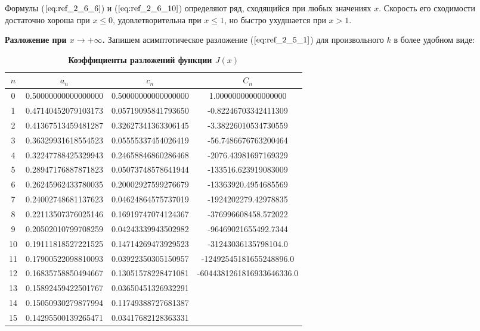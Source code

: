 Формулы ($\ref{eq:ref_2_6_6}$) и ($\ref{eq:ref_2_6_10}$) определяют ряд, сходящийся при любых значениях $x$.
Скорость его сходимости достаточно хороша при $x \leqslant 0$, удовлетворительна при
$x \leqslant 1$, но быстро ухудшается при $x > 1$.

\textbf{Разложение при $x \to +\infty$.} Запишем асимптотическое разложение ($\ref{eq:ref_2_5_1}$) для
произвольного $k$ в более удобном виде:

\begin{table}[]
\caption{\textbf{Коэффициенты разложений функции $J(x)$}}
\begin{center}
\begin{tabular}{|c|c|c|c|}
\hline
$n$ & $a_n$ & $c_n$ & $C_n$ \\
\hline
0  & 0.50000000000000000 & 0.50000000000000000 & 1.00000000000000000 \\
1  & 0.47140452079103173 & 0.05719095841793650 & -0.82246703342411309 \\
2  & 0.41367513459481287 & 0.32627341363306145 & -3.38226010534730559 \\
3  & 0.36329931618554523 & 0.05555337454026419 & -56.7486676763200464 \\
4  & 0.32247788425329943 & 0.24658846860286468 & -2076.43981697169329 \\
5  & 0.28947176887871823 & 0.05073748578641944 & -133516.623919083009 \\
6  & 0.26245962433780035 & 0.20002927599276679 & -13363920.4954685569 \\
7  & 0.24002748681137623 & 0.04624864575737019 & -1924202279.42978835 \\
8  & 0.22113507376025146 & 0.16919747074124367 & -376996608458.572022 \\
9  & 0.20502010799708259 & 0.04243339943502982 & -96469021655492.7344 \\
10 & 0.19111818527221525 & 0.14714269473929523 & -31243036135798104.0  \\
11 & 0.17900522098810093 & 0.03922350305150957 & -12492545181655248896.0 \\
12 & 0.16835758850494667 & 0.13051578228471081 & -6044381261816933646336.0 \\
13 & 0.15892459422501767 & 0.03650451326932291 &                      \\
14 & 0.15050930279877994 & 0.11749388727681387 &                      \\
15 & 0.14295500139265471 & 0.03417682128363331 &                      \\

\end{tabular}
\end{center}
\end{table}
